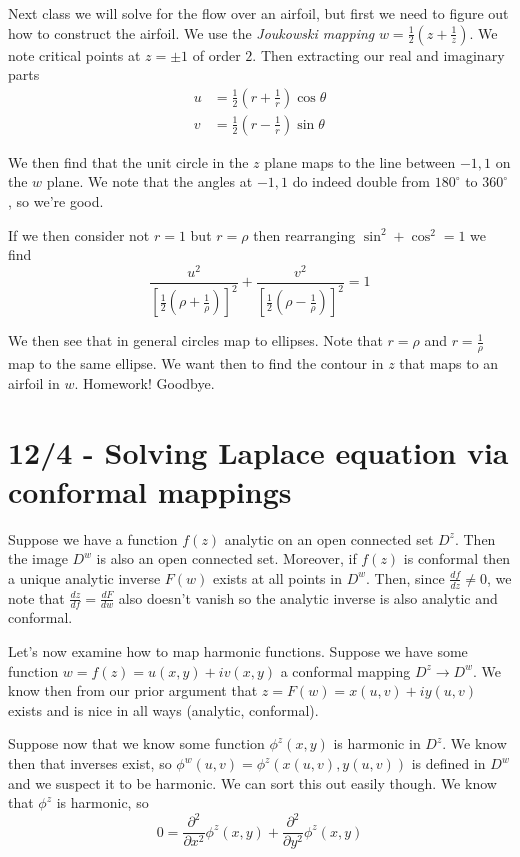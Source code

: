 \documentclass[10pt]{report}
\newcommand{\ptd}[2]{\frac{\partial^2 #1}{\partial#2^2}}
\newcommand{\rd}[2]{\frac{d#1}{d#2}}
\begin{document}
Next class we will solve for the flow over an airfoil, but first we need to figure out how to construct the airfoil. We use the \emph{Joukowski mapping} $w = \frac{1}{2}\left( z + \frac{1}{z} \right)$. We note critical points at $z = \pm 1$ of order $2$. Then extracting our real and imaginary parts
\begin{align*}
    u&=\frac{1}{2}\left( r+\frac{1}{r} \right)\cos\theta\\
    v &= \frac{1}{2}\left( r - \frac{1}{r} \right)\sin\theta
\end{align*}

We then find that the unit circle in the $z$ plane maps to the line between $-1,1$ on the $w$ plane. We note that the angles at $-1,1$ do indeed double from $180^\circ$ to $360^\circ$, so we're good. 

If we then consider not $r=1$ but $r=\rho$ then rearranging $\sin^2 + \cos^2 = 1$ we find
$$\frac{u^2}{\left[\frac{1}{2}\left( \rho + \frac{1}{\rho} \right)\right]^2} + \frac{v^2}{\left[ \frac{1}{2}\left( \rho - \frac{1}{\rho} \right) \right]^2} = 1$$

We then see that in general circles map to ellipses. Note that $r = \rho$ and $r = \frac{1}{\rho}$ map to the same ellipse. We want then to find the contour in $z$ that maps to an airfoil in $w$. Homework! Goodbye.

\chapter{12/4 - Solving Laplace equation via conformal mappings}

Suppose we have a function $f(z)$ analytic on an open connected set $D^z$. Then the image $D^w$ is also an open connected set. Moreover, if $f(z)$ is conformal then a unique analytic inverse $F(w)$ exists at all points in $D^w$. Then, since $\rd{f}{z} \neq 0$, we note that $\rd{z}{f} = \rd{F}{w}$ also doesn't vanish so the analytic inverse is also analytic and conformal.

Let's now examine how to map harmonic functions. Suppose we have some function $w = f(z) = u(x,y) + iv(x,y)$ a conformal mapping $D^z \to D^w$. We know then from our prior argument that $z=F(w) = x(u,v) + iy(u,v)$ exists and is nice in all ways (analytic, conformal). 

Suppose now that we know some function $\phi^z(x,y)$ is harmonic in $D^z$. We know then that inverses exist, so $\phi^w(u,v) = \phi^z(x(u,v),y(u,v))$ is defined in $D^w$ and we suspect it to be harmonic. We can sort this out easily though. We know that $\phi^z$ is harmonic, so
$$0 = \ptd{}{x} \phi^z(x,y) + \ptd{}{y}\phi^z(x,y)$$
\end{document}

